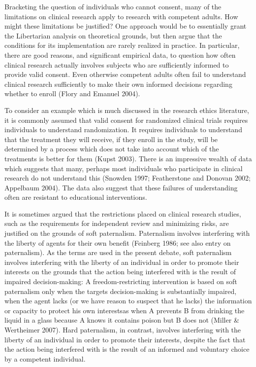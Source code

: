 \documentclass[12p]{article}
\begin{document}
Bracketing the question of individuals who cannot consent, many of the limitations on clinical research apply to research with competent adults. How might these limitations be justified? One approach would be to essentially grant the Libertarian analysis on theoretical grounds, but then argue that the conditions for its implementation are rarely realized in practice. In particular, there are good reasons, and significant empirical data, to question how often clinical research actually involves subjects who are sufficiently informed to provide valid consent. Even otherwise competent adults often fail to understand clinical research sufficiently to make their own informed decisions regarding whether to enroll (Flory and Emanuel 2004).

To consider an example which is much discussed in the research ethics literature, it is commonly assumed that valid consent for randomized clinical trials requires individuals to understand randomization. It requires individuals to understand that the treatment they will receive, if they enroll in the study, will be determined by a process which does not take into account which of the treatments is better for them (Kupst 2003). There is an impressive wealth of data which suggests that many, perhaps most individuals who participate in clinical research do not understand this (Snowden 1997; Featherstone and Donovan 2002; Appelbaum 2004). The data also suggest that these failures of understanding often are resistant to educational interventions.

It is sometimes argued that the restrictions placed on clinical research studies, such as the requirements for independent review and minimizing risks, are justified on the grounds of soft paternalism. Paternalism involves interfering with the liberty of agents for their own benefit (Feinberg 1986; see also entry on paternalism). As the terms are used in the present debate, soft paternalism involves interfering with the liberty of an individual in order to promote their interests on the grounds that the action being interfered with is the result of impaired decision-making: A freedom-restricting intervention is based on soft paternalism only when the targets decision-making is substantially impaired, when the agent lacks (or we have reason to suspect that he lacks) the information or capacity to protect his own interestsas when A prevents B from drinking the liquid in a glass because A knows it contains poison but B does not (Miller & Wertheimer 2007). Hard paternalism, in contrast, involves interfering with the liberty of an individual in order to promote their interests, despite the fact that the action being interfered with is the result of an informed and voluntary choice by a competent individual.
\end{document}
